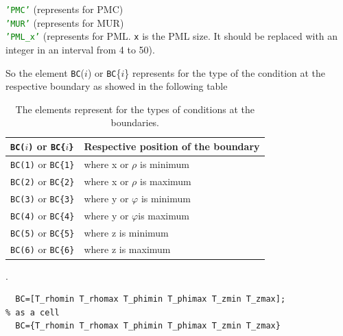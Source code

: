 \begin{myindentpar}
\begin{myindentpar}
\begin{myindentpar}
	     \textcolor{green}{\texttt{'PMC'}} \qquad   (represents for PMC)\\
	     \textcolor{green}{\texttt{'MUR'}}  \qquad  (represents for MUR)\\
	     \textcolor{green}{\texttt{'PML\_x'}} \qquad   (represents for PML. \texttt{x} is  the PML size. It should be replaced with an integer in an interval from 4 to 50).
	  \end{myindentpar}	
	\end{myindentpar}	
	  So the element \texttt{BC}($i$) or \texttt{BC}\{$i$\} represents for the type of the  condition at the respective boundary as showed in the following table
	  \begin{table}[htb]\centering
	  \begin{tabular}{l|l}
	  \texttt{BC($i$)} or \texttt{BC\{$i$\}} & Respective position of the boundary\\ \hline
		 \texttt{BC(1)} or  \texttt{BC\{1\}} & where x or $\rho$ is minimum\\
		 \texttt{BC(2)} or  \texttt{BC\{2\}}& where x or $\rho$ is maximum\\
		 \texttt{BC(3)} or  \texttt{BC\{3\}}& where y or $\varphi$ is minimum\\
		 \texttt{BC(4)} or  \texttt{BC\{4\}}& where y or $\varphi$is maximum\\
		 \texttt{BC(5)} or  \texttt{BC\{5\}}& where z is minimum\\
		 \texttt{BC(6)} or  \texttt{BC\{6\}}& where z is maximum
	  \end{tabular}\caption{The elements represent for the types of conditions at the boundaries.}
	  \end{table}
	  \label{Elements of BC and the rescpective boundaries}.
         \end{myindentpar}
         \begin{lstlisting}[caption={\texttt{BC} in a cylindrical coordinate},label={ListingCylinBC}]
% as a vector
  BC=[T_rhomin T_rhomax T_phimin T_phimax T_zmin T_zmax];
% as a cell
  BC={T_rhomin T_rhomax T_phimin T_phimax T_zmin T_zmax}
	  \end{lstlisting}%
